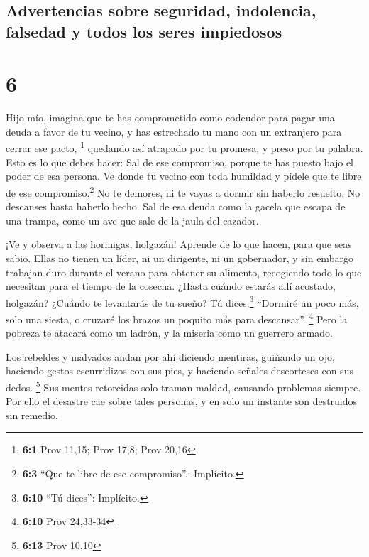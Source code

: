 \hypertarget{advertencias-sobre-seguridad-indolencia-falsedad-y-todos-los-seres-impiedosos}{%
\subsection{Advertencias sobre seguridad, indolencia, falsedad y todos
los seres
impiedosos}\label{advertencias-sobre-seguridad-indolencia-falsedad-y-todos-los-seres-impiedosos}}

\hypertarget{section-5}{%
\section{6}\label{section-5}}

 Hijo mío, imagina que te has comprometido como codeudor
para pagar una deuda a favor de tu vecino, y has estrechado tu mano con
un extranjero para cerrar ese pacto, \footnote{\textbf{6:1} Prov 11,15;
  Prov 17,8; Prov 20,16}  quedando así atrapado por tu
promesa, y preso por tu palabra.  Esto es lo que debes
hacer: Sal de ese compromiso, porque te has puesto bajo el poder de esa
persona. Ve donde tu vecino con toda humildad y pídele que te libre de
ese compromiso.\footnote{\textbf{6:3} ``Que te libre de ese
  compromiso''.: Implícito.}  No te demores, ni te vayas a
dormir sin haberlo resuelto. No descanses hasta haberlo hecho.
 Sal de esa deuda como la gacela que escapa de una trampa,
como un ave que sale de la jaula del cazador.

 ¡Ve y observa a las hormigas, holgazán! Aprende de lo que
hacen, para que seas sabio.  Ellas no tienen un líder, ni
un dirigente, ni un gobernador,  y sin embargo trabajan
duro durante el verano para obtener su alimento, recogiendo todo lo que
necesitan para el tiempo de la cosecha.  ¿Hasta cuándo
estarás allí acostado, holgazán? ¿Cuándo te levantarás de tu sueño?
 Tú dices:\footnote{\textbf{6:10} ``Tú dices'':
  Implícito.} ``Dormiré un poco más, solo una siesta, o cruzaré los
brazos un poquito más para descansar''. \footnote{\textbf{6:10} Prov
  24,33-34}  Pero la pobreza te atacará como un ladrón, y
la miseria como un guerrero armado.

 Los rebeldes y malvados andan por ahí diciendo mentiras,
 guiñando un ojo, haciendo gestos escurridizos con sus
pies, y haciendo señales descorteses con sus dedos. \footnote{\textbf{6:13}
  Prov 10,10}  Sus mentes retorcidas solo traman maldad,
causando problemas siempre.  Por ello el desastre cae
sobre tales personas, y en solo un instante son destruidos sin remedio.

